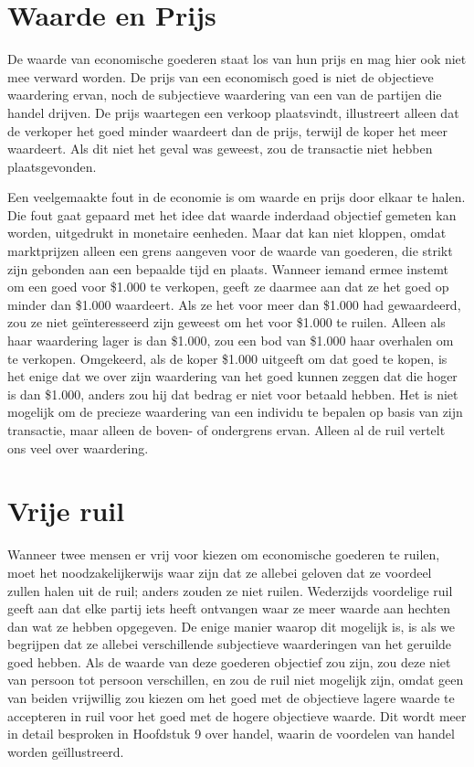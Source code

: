 \section{Waarde en Prijs}

De waarde van economische goederen staat los van hun prijs en mag hier ook niet mee verward worden. De prijs van een economisch goed is niet de objectieve waardering ervan, noch de subjectieve waardering van een van de partijen die handel drijven. De prijs waartegen een verkoop plaatsvindt, illustreert alleen dat de verkoper het goed minder waardeert dan de prijs, terwijl de koper het meer waardeert. Als dit niet het geval was geweest, zou de transactie niet hebben plaatsgevonden.

Een veelgemaakte fout in de economie is om waarde en prijs door elkaar te halen. Die fout gaat gepaard met het idee dat waarde inderdaad objectief gemeten kan worden, uitgedrukt in monetaire eenheden. Maar dat kan niet kloppen, omdat marktprijzen alleen een grens aangeven voor de waarde van goederen, die strikt zijn gebonden aan een bepaalde tijd en plaats. Wanneer iemand ermee instemt om een goed voor \$1.000 te verkopen, geeft ze daarmee aan dat ze het goed op minder dan \$1.000 waardeert. Als ze het voor meer dan \$1.000 had gewaardeerd, zou ze niet geïnteresseerd zijn geweest om het voor \$1.000 te ruilen. Alleen als haar waardering lager is dan \$1.000, zou een bod van \$1.000 haar overhalen om te verkopen. Omgekeerd, als de koper \$1.000 uitgeeft om dat goed te kopen, is het enige dat we over zijn waardering van het goed kunnen zeggen dat die hoger is dan \$1.000, anders zou hij dat bedrag er niet voor betaald hebben. Het is niet mogelijk om de precieze waardering van een individu te bepalen op basis van zijn transactie, maar alleen de boven- of ondergrens ervan. Alleen al de ruil vertelt ons veel over waardering.

\section{Vrije ruil}

Wanneer twee mensen er vrij voor kiezen om economische goederen te ruilen, moet het noodzakelijkerwijs waar zijn dat ze allebei geloven dat ze voordeel zullen halen uit de ruil; anders zouden ze niet ruilen. Wederzijds voordelige ruil geeft aan dat elke partij iets heeft ontvangen waar ze meer waarde aan hechten dan wat ze hebben opgegeven. De enige manier waarop dit mogelijk is, is als we begrijpen dat ze allebei verschillende subjectieve waarderingen van het geruilde goed hebben. Als de waarde van deze goederen objectief zou zijn, zou deze niet van persoon tot persoon verschillen, en zou de ruil niet mogelijk zijn, omdat geen van beiden vrijwillig zou kiezen om het goed met de objectieve lagere waarde te accepteren in ruil voor het goed met de hogere objectieve waarde. Dit wordt meer in detail besproken in Hoofdstuk 9 over handel, waarin de voordelen van handel worden geïllustreerd.

